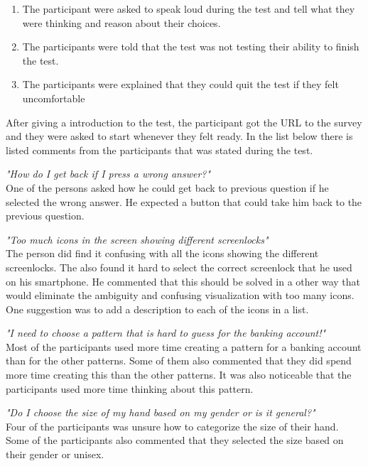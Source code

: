       \begin{enumerate}
        \item The participant were asked to speak loud during the test and tell what they were thinking and reason about their choices.
        \item The participants were told that the test was not testing their ability to finish the test.
        \item The participants were explained that they could quit the test if they felt uncomfortable
      \end{enumerate}

    After giving a introduction to the test, the participant got the URL to the survey and they were asked to start whenever they felt ready. In the list below there is listed comments from the participants that was stated during the test.
        
    {\it "How do I get back if I press a wrong answer?"}\\ 
    One of the persons asked how he could get back to previous question if he selected the wrong answer. He expected a button that could take him back to the previous question.
    
    {\it "Too much icons in the screen showing different screenlocks"}\\ 
    The person did find it confusing with all the icons showing the different screenlocks. The  also found it hard to select the correct screenlock that he used on his smartphone. He commented that this should be solved in a other way that would eliminate the ambiguity and confusing visualization with too many icons. One suggestion was to add a description to each of the icons in a list.
      
    {\it "I need to choose a pattern that is hard to guess for the banking account!"}\\ 
    Most of the participants used more time creating a pattern for a banking account than for the other patterns. Some of them also commented that they did spend more time creating this than the other patterns. It was also noticeable that the participants used more time thinking about this pattern.
    
    {\it "Do I choose the size of my hand based on my gender or is it general?"}\\ 
    Four of the participants was unsure how to categorize the size of their hand. Some of the participants also commented that they selected the size based on their gender or unisex.
      
